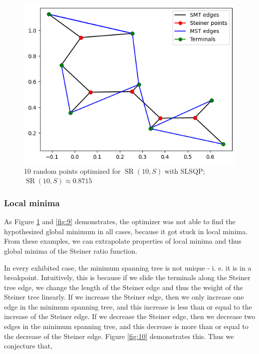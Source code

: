 \documentclass{mpaper}
\begin{document}
\begin{figure}
  \begin{center}
  \includegraphics[scale=0.5]{plot8715.png}
  \end{center}
  \caption{\label{fig:8}10 random points optimized for $\operatorname{SR}(10, S)$ with SLSQP; $\operatorname{SR}(10, S)\approx 0.8715$}
\end{figure}

\subsubsection{Local minima}

As Figure \ref{fig:8} and \ref{fig:9} demonstrates, the optimizer was not able to find the hypothesized global minimum in all cases, because it got stuck in local minima. From these examples, we can extrapolate properties of local minima and thus global minima of the Steiner ratio function.

In every exhibited case, the minimum spanning tree is not unique - i. e. it is in a breakpoint. Intuitively, this is because if we slide the terminals along the Steiner tree edge, we change the length of the Steiner edge and thus the weight of the Steiner tree linearly. If we increase the Steiner edge, then we only increase one edge in the minimum spanning tree, and this increase is less than or equal to the increase of the Steiner edge. If we decrease the Steiner edge, then we decrease two edges in the minimum spanning tree, and this decrease is more than or equal to the decrease of the Steiner edge. Figure \ref{fig:10} demonstrates this. Thus we conjecture that,
\end{document}
